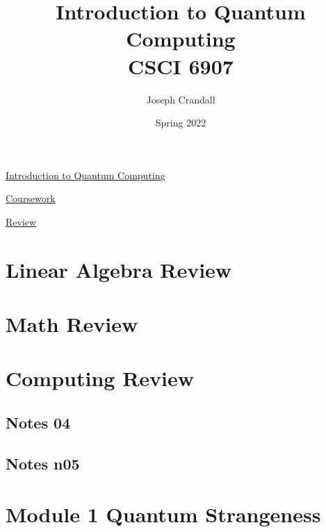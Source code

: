 
\usepackage{algorithm, algpseudocode, color, gensymb, siunitx, soul, subfiles, verbatim}
\usepackage[a4paper, total={7.5in, 10in}]{geometry}

\title{Introduction to Quantum Computing\\
\large CSCI 6907}
\author{Joseph Crandall}
\date{Spring 2022}


\maketitle

\href{https://www2.seas.gwu.edu/~simhaweb/quantum/index.html}{Introduction to Quantum Computing}

\href{https://www2.seas.gwu.edu/~simhaweb/quantum/coursework.html}{Coursework}


\href{https://www2.seas.gwu.edu/~simhaweb/quantum/modules/review/review.html}{Review}


\section{Linear Algebra Review}


\section{Math Review}


\section{Computing Review}


\subsection{Notes 04}


\subsection{Notes n05}


\section{Module 1 Quantum Strangeness}


